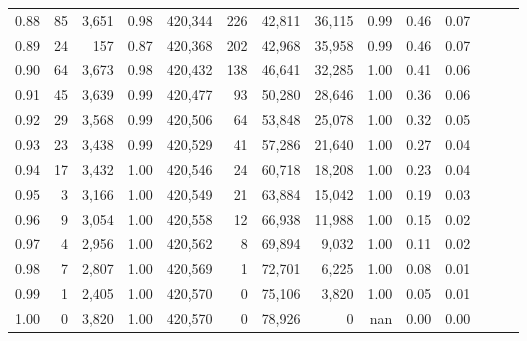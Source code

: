 \begin{tabular}{rrrrrrrrrrrrrr}
0.88 &      85 &  3,651 &  0.98 &  420,344 &      226 &  42,811 &  36,115 &  0.99 &  0.46 &      0.07 \\
0.89 &      24 &    157 &  0.87 &  420,368 &      202 &  42,968 &  35,958 &  0.99 &  0.46 &      0.07 \\
0.90 &      64 &  3,673 &  0.98 &  420,432 &      138 &  46,641 &  32,285 &  1.00 &  0.41 &      0.06 \\
0.91 &      45 &  3,639 &  0.99 &  420,477 &       93 &  50,280 &  28,646 &  1.00 &  0.36 &      0.06 \\
0.92 &      29 &  3,568 &  0.99 &  420,506 &       64 &  53,848 &  25,078 &  1.00 &  0.32 &      0.05 \\
0.93 &      23 &  3,438 &  0.99 &  420,529 &       41 &  57,286 &  21,640 &  1.00 &  0.27 &      0.04 \\
0.94 &      17 &  3,432 &  1.00 &  420,546 &       24 &  60,718 &  18,208 &  1.00 &  0.23 &      0.04 \\
0.95 &       3 &  3,166 &  1.00 &  420,549 &       21 &  63,884 &  15,042 &  1.00 &  0.19 &      0.03 \\
0.96 &       9 &  3,054 &  1.00 &  420,558 &       12 &  66,938 &  11,988 &  1.00 &  0.15 &      0.02 \\
0.97 &       4 &  2,956 &  1.00 &  420,562 &        8 &  69,894 &   9,032 &  1.00 &  0.11 &      0.02 \\
0.98 &       7 &  2,807 &  1.00 &  420,569 &        1 &  72,701 &   6,225 &  1.00 &  0.08 &      0.01 \\
0.99 &       1 &  2,405 &  1.00 &  420,570 &        0 &  75,106 &   3,820 &  1.00 &  0.05 &      0.01 \\
1.00 &       0 &  3,820 &  1.00 &  420,570 &        0 &  78,926 &       0 &   nan &  0.00 &      0.00 \\
\bottomrule
\end{tabular}

